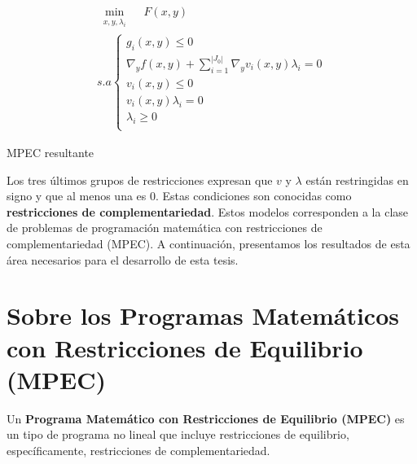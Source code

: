         
       \begin{table}[H]
        \centering
        \begin{equation}
            \begin{array}{l}
                \underset{\substack{x, y, \lambda_i}}{\min} \quad F(x, y)\\
                s.a \left\{ 
                \begin{array}{l}
                    g_i(x, y) \leq 0\\
                    \nabla_{y} f(x, y) + \sum_{i=1}^{|J_{0}|} \nabla_{y} v_i(x, y) \lambda_i = 0 \\
                    v_i(x, y) \leq 0 \\
                    v_i(x, y)\lambda_i = 0 \\
                    \lambda_i \geq 0\\
                \end{array}\right.
                \tag{\theequation}
            \end{array}
            \label{eq:KKT_Optimista}
        \end{equation}
        \caption*{MPEC resultante}
        
    \end{table}
    
Los tres últimos grupos de restricciones expresan que $v$ y $\lambda$ están restringidas en signo y que al menos una es 0. Estas condiciones son conocidas como \textbf{restricciones de complementariedad}. Estos modelos corresponden a la clase de problemas de programación matemática con restricciones de complementariedad (MPEC). A continuación, presentamos los resultados de esta área necesarios para el desarrollo de esta tesis.

\section{Sobre los Programas Matemáticos con Restricciones de Equilibrio (MPEC)}
Un \textbf{Programa Matemático con Restricciones de Equilibrio (MPEC)} es un tipo de programa no lineal que incluye restricciones de equilibrio, específicamente, restricciones de complementariedad.

